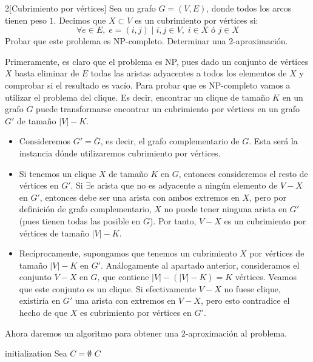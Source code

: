 \documentclass[twoside]{article}
\begin{document}
\begin{ejercicio}{2}[Cubrimiento por vértices]
Sea un grafo $G=(V,E)$, donde todos los arcos tienen peso $1$. Decimos que $X\subset V$ es un cubrimiento por vértices si:
$$
\forall e \in E, \; e = (i,j) \mid i,j \in V, \; i \in X \text{ ó } j\in X
$$
Probar que este problema es NP-completo. Determinar una 2-aproximación.
\end{ejercicio}

\begin{solucion}
Primeramente, es claro que el problema es NP, pues dado un conjunto de vértices $X$ basta eliminar de $E$ todas las aristas adyacentes a todos los elementos de $X$ y comprobar si el resultado es vacío. Para probar que es NP-completo vamos a utilizar el problema del clique. Es decir, encontrar un clique de tamaño $K$ en un grafo $G$ puede transformarse encontrar un cubrimiento por vértices en un grafo $G'$ de tamaño $|V|-K$. 
\begin{itemize}
\item Consideremos $G'=\overline{G}$, es decir, el grafo complementario de $G$. Esta será la instancia dónde utilizaremos  cubrimiento por vértices. 
\item Si tenemos un clique $X$ de tamaño $K$ en $G$, entonces consideremos el resto de vértices en $G'$. Si $\exists e$ arista que no es adyacente a ningún elemento de $V-X$ en $G'$, entonces debe ser una arista con ambos extremos en $X$, pero por definición de grafo complementario, $X$ no puede tener ninguna arista en $G'$ (pues tienen todas las posible en $G$). Por tanto, $V-X$ es un cubrimiento por vértices de tamaño $|V|-K$.
\item Recíprocamente, supongamos que tenemos un cubrimiento $X$ por vértices de tamaño $|V|-K$ en $G'$. Análogamente al apartado anterior, consideramos el conjunto $V-X$ en $G$, que contiene $|V|-(|V|-K)=K$ vértices. Veamos que este conjunto es un clique. Si efectivamente $V-X$ no fuese clique, existiría en $G'$ una arista con extremos en $V-X$, pero esto contradice el hecho de que $X$ es cubrimiento por vértices en $G'$.
\end{itemize}
Ahora daremos un algoritmo para obtener una $2$-aproximación al problema.
\begin{algorithm}
 initialization\; 
 Sea $C = \emptyset$\;
\Return $C$
\end{algorithm}


\end{solucion}
\end{document}
